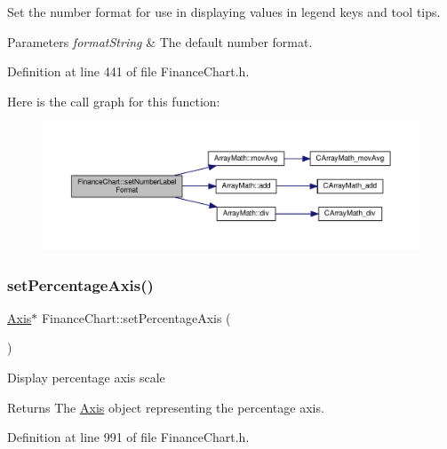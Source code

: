 Set the number format for use in displaying values in legend keys and tool tips. 


\begin{DoxyParams}{Parameters}
{\em format\+String} & The default number format.\\
\hline
\end{DoxyParams}


Definition at line 441 of file Finance\+Chart.\+h.

Here is the call graph for this function\+:
\nopagebreak
\begin{figure}[H]
\begin{center}
\leavevmode
\includegraphics[width=350pt]{class_finance_chart_abc4de6b32c4cfb3ea99b0becd05fc11c_cgraph}
\end{center}
\end{figure}
\mbox{\label{class_finance_chart_aae20ef522feef3ab61e8b8639c15275e}} 
\subsubsection{\texorpdfstring{set\+Percentage\+Axis()}{setPercentageAxis()}}
{\footnotesize\ttfamily \hyperlink{class_axis}{Axis}$\ast$ Finance\+Chart\+::set\+Percentage\+Axis (\begin{DoxyParamCaption}{ }\end{DoxyParamCaption})\hspace{0.3cm}{\ttfamily [inline]}}



Display percentage axis scale 

\begin{DoxyReturn}{Returns}
The \hyperlink{class_axis}{Axis} object representing the percentage axis.
\end{DoxyReturn}


Definition at line 991 of file Finance\+Chart.\+h.

